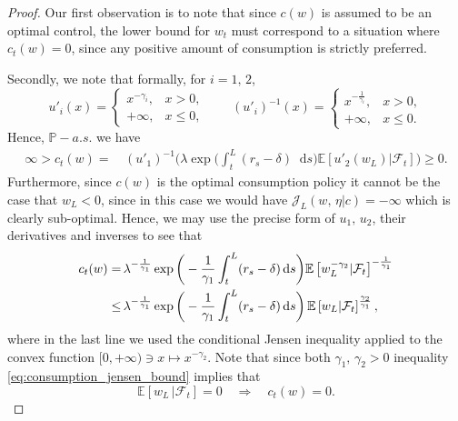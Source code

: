 \documentclass[11pt,oneside,english,reqno,dvipsnames,table]{amsart}
\numberwithin{equation}{section}
\theoremstyle{plain}
\theoremstyle{definition}
\theoremstyle{remark}
\theoremstyle{plain}
\theoremstyle{plain}
\theoremstyle{plain}
\theoremstyle{plain}
\theoremstyle{plain}
\theoremstyle{plain}
\theoremstyle{plain}
\newcommand{\cF}{\mathcal{F}}
\newcommand{\EE}{\mathbb{E}}
\newcommand{\dd}{\mathop{}\!\mathrm{d}}
\newcommand{\mcF}{\mathcal{F}}
\newcommand{\mcJ}{\mathcal{J}}
\newcommand{\mbE}{\mathbb{E}}
\newcommand{\mbP}{\mathbb{P}}
\numberwithin{thm}{section}
\begin{document}
\begin{proof}
%
%

Our first observation is to note that since $c(w)$ is assumed to be an optimal control, the lower bound for $w_t$ must correspond to a situation where $c_t(w)=0$, since any positive amount of consumption is strictly preferred.


Secondly, we note that formally, for $i=1,\,2$,
%
\begin{equation}
    u'_i(x) = \begin{cases}
        x^{-\gamma_i}, & x> 0,\\
        +\infty, & x\leq  0,
    \end{cases}
    \qquad
    (u'_i)^{-1}(x) = \begin{cases}
        x^{-\frac{1}{\gamma_i}}, & x > 0,\\
        +\infty, & x\leq 0.
    \end{cases}
\end{equation}
%
Hence, $\mbP-a.s.$ we have
%
\begin{align*}
\infty > c_t(w) =&\, (u'_1)^{-1} \bigg( \lambda \exp\bigg( \int_t^L (r_s-\delta) \dd s \bigg)  \EE \left[ u'_2(w_L) |\cF_t\right]\bigg) \geq 0.
\end{align*}
%
Furthermore, since $c(w)$ is the optimal consumption policy it cannot be the case that $w_L <0$, since in this case we would have $\mcJ_L(w,\, \eta|c) =-\infty$ which is clearly sub-optimal. Hence, we may use the precise form of $u_1,\,u_2$, their derivatives and inverses to see that
%
\begin{align}
    c_t(w) = &\, \lambda^{-\frac{1}{\gamma_1}} \exp\bigg( -\frac{1}{\gamma_1}\int_t^L (r_s-\delta) \dd s \bigg)  \EE \left[ w_L^{-\gamma_2}|\cF_t\right]^{-\frac{1}{\gamma_1}} \notag \\
    \leq &\, \lambda^{-\frac{1}{\gamma_1}} \exp\bigg( -\frac{1}{\gamma_1}\int_t^L (r_s-\delta) \dd s\bigg) \,  \EE \left[ w_L|\cF_t\right]^{\frac{\gamma_2}{\gamma_1}}, \label{eq:consumption_jensen_bound}
\end{align}
%
where in the last line we used the conditional Jensen inequality applied to the convex function $[0,+\infty) \ni x\mapsto x^{-\gamma_2}$. Note that since both $\gamma_1,\,\gamma_2 >0$ inequality \eqref{eq:consumption_jensen_bound} implies that
%
\begin{equation*}
    \mbE[w_L\,|\mcF_t] =0 \quad \Rightarrow \quad c_t(w)=0.
\end{equation*}


\end{proof}
\end{document}
